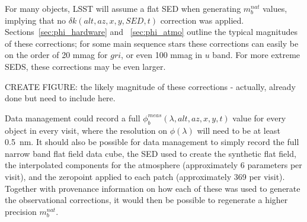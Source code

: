 \documentclass[12pt,preprint]{aastex}
\begin{document}
For many objects, LSST will assume a flat SED when generating
$m_b^{nat}$ values, implying that no $\delta k(alt, az, x, y, SED, t)$
correction was applied. Sections~\ref{sec:phi_hardware} and
~\ref{sec:phi_atmo} outline the typical magnitudes of these corrections;
for some main sequence stars these corrections can easily be on the
order of 20 mmag for $gri$, or even 100 mmag in $u$ band. For more
extreme SEDS, these corrections may be even larger.

CREATE FIGURE: the likely magnitude of these corrections - actually,
already done but need to include here.

Data management could record a full
$\phi_b^{meas}(\lambda,alt,az,x,y,t)$ value for every object in every
visit, where the resolution on $\phi(\lambda)$ will need to be at
least 0.5~nm.  It should also be possible for data management to
simply record the full narrow band flat field data cube, the SED used
to create the synthetic flat field, the interpolated components for
the atmosphere (approximately 6 parameters per visit), and the
zeropoint applied to each patch (approximately 369 per
visit). Together with provenance information on how each of these was
used to generate the observational corrections, it would then be possible
to regenerate a higher precision $m_b^{nat}$.






\end{document}
